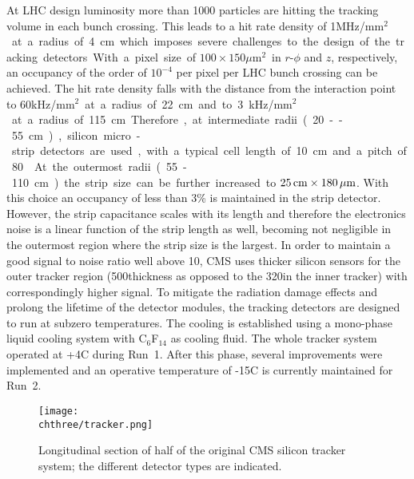 At LHC design luminosity more than 1000 particles are hitting the tracking volume in each bunch crossing. This leads to a hit rate density of 1\unit{MHz/mm$^2$} at a radius of 4\cm which imposes severe challenges to the design of the tracking detectors. With a pixel size of $100\times150$\unit{$\mu\mathrm{m}^2$} in $r$-$\phi$ and $z$, respectively, an occupancy of the order of $10^{-4}$ per pixel per LHC bunch crossing can be achieved. The hit rate density falls with the distance from the interaction point to 60\unit{kHz/mm$^2$} at a radius of 22\cm and to 3\unit{kHz/mm$^2$} at a radius of 115\cm. Therefore, at intermediate radii (20--55\cm), silicon micro-strip detectors are used, with a typical cell length of 10\cm and a pitch of 80\mum. At the outermost radii (55-110\cm)
the strip size can be further increased to $25\,\text{cm}\times180\,\mu\text{m}$. With this choice an occupancy of less than 3\% is maintained in the strip detector.
However, the strip capacitance scales with its length and therefore the electronics noise is a linear function of the strip length as well, becoming not negligible in the outermost region where the strip size is the largest. In order to maintain a good signal to noise ratio well above 10, CMS uses thicker silicon sensors for the outer tracker region (500\mum thickness as opposed to the 320\mum in the inner tracker) with correspondingly higher signal. To mitigate the radiation damage effects and prolong the lifetime of the detector modules, the tracking detectors are designed to run at subzero temperatures. The cooling is established using a mono-phase liquid cooling system with C$_6$F$_{14}$ as cooling fluid. The whole tracker system operated at +4\de\unit{C} during Run~1. After this phase, several improvements were implemented and an operative temperature of -15\de\unit{C} is currently maintained for Run~2.\\

\begin{figure}[!htb]
 \begin{center}
  \texttt{[image: \\chthree/tracker.png]}
 \end{center}
 \caption{Longitudinal section of half of the original CMS silicon tracker system; the different detector types are indicated.}
 \label{fig:TrackerLayout}
\end{figure}

